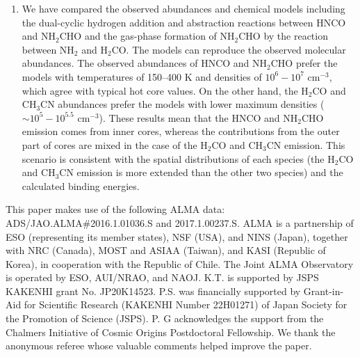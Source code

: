 \documentclass[twocolumn, twocolappendix]{aastex631}
\begin{document}
\begin{enumerate}
\item We have compared the observed abundances and chemical models including the dual-cyclic hydrogen addition and abstraction reactions between HNCO and NH$_{2}$CHO and the gas-phase formation of NH$_{2}$CHO by the reaction between NH$_{2}$ and H$_{2}$CO.
The models can reproduce the observed molecular abundances.
The observed abundances of HNCO and NH$_{2}$CHO prefer the models with temperatures of 150--400 K and densities of $10^{6}-10^{7}$ cm$^{-3}$, which agree with typical hot core values.
On the other hand, the H$_{2}$CO and CH$_{3}$CN abundances prefer the models with lower maximum densities ($\sim10^{5}-10^{5.5}$ cm$^{-3}$).
These results mean that the HNCO and NH$_{2}$CHO emission comes from inner cores, whereas the contributions from the outer part of cores are mixed in the case of the H$_{2}$CO and CH$_{3}$CN emission.
This scenario is consistent with the spatial distributions of each species (the H$_{2}$CO and CH$_{3}$CN emission is more extended than the other two species) and the calculated binding energies.
\end{enumerate}


\begin{acknowledgments}
This paper makes use of the following ALMA data: ADS/JAO.ALMA\#2016.1.01036.S and 2017.1.00237.S. 
ALMA is a partnership of ESO (representing its member states), NSF (USA), and NINS (Japan), together with NRC (Canada), MOST and ASIAA (Taiwan), and KASI (Republic of Korea), in cooperation with the Republic of Chile. The Joint ALMA Observatory is operated by ESO, AUI/NRAO, and NAOJ.
K.T. is supported by JSPS KAKENHI grant No. JP20K14523.
P.S. was financially supported by Grant-in-Aid for Scientific Research (KAKENHI Number  22H01271) of Japan Society for the Promotion of Science (JSPS).
P. G acknowledges the support from the Chalmers Initiative of Cosmic Origins Postdoctoral Fellowship.
We thank the anonymous referee whose valuable comments helped improve the paper.
\end{acknowledgments}


\vspace{5mm}
\end{document}
